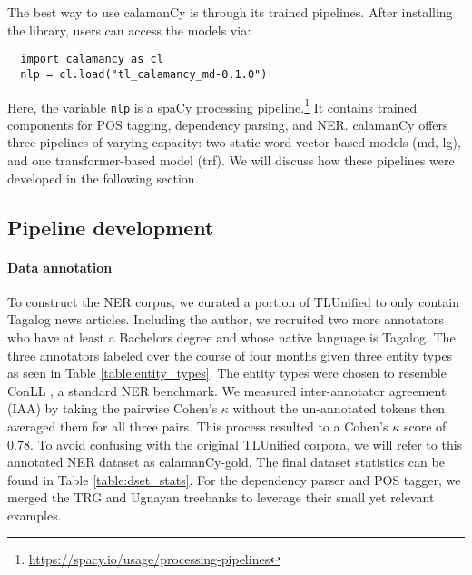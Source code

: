 \documentclass[11pt]{article}
\begin{document}
The best way to use calamanCy is through its trained pipelines.
After installing the library, users can access the models via:

\begin{verbatim}
  import calamancy as cl
  nlp = cl.load("tl_calamancy_md-0.1.0")
\end{verbatim}

Here, the variable \texttt{nlp} is a spaCy processing pipeline.\footnote[2]{\url{https://spacy.io/usage/processing-pipelines}}
It contains trained components for POS tagging, dependency parsing, and NER.
calamanCy offers three pipelines of varying capacity: two static word vector-based models (md, lg), and one transformer-based model (trf).
We will discuss how these pipelines were developed in the following section.

\subsection{Pipeline development}

\paragraph*{Data annotation}
To construct the NER corpus, we curated a portion of TLUnified \citep{Cruz2021ImprovingLL} to only contain Tagalog news articles.
Including the author, we recruited two more annotators who have at least a Bachelors degree and whose native language is Tagalog.
The three annotators labeled over the course of four months given three entity types as seen in Table \ref{table:entity_types}.
The entity types were chosen to resemble ConLL \citep{Sang2002IntroductionTT,Sang2003IntroductionTT}, a standard NER benchmark.
We measured inter-annotator agreement (IAA) by taking the pairwise Cohen's $\kappa$ without the un-annotated tokens then averaged them for all three pairs.
This process resulted to a Cohen's $\kappa$ score of 0.78. 
To avoid confusing with the original TLUnified corpora, we will refer to this annotated NER dataset as calamanCy-gold.
The final dataset statistics can be found in Table \ref{table:dset_stats}.
For the dependency parser and POS tagger, we merged the TRG \citep{Samson2018TRG} and Ugnayan \citep{Aquino2020ParsingIT} treebanks to leverage their small yet relevant examples.






\end{document}
